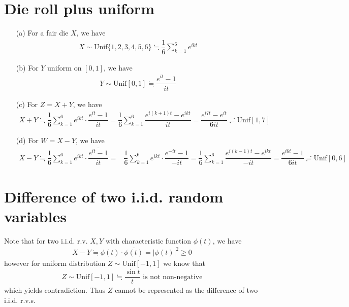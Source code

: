 \documentclass[11pt,a4paper]{article}
\numberwithin{equation}{section}%
\begin{document}
    

\section{Die roll plus uniform}\label{sec:die_roll_plus_uniform}



\begin{itemize}[topsep=2pt,itemsep=0pt]
    \item[(a)] For a fair die $ X $, we have
    \begin{align*}
         X\sim \mathrm{ Unif } \{1,2,3,4,5,6\} \fallingdotseq \dfrac{ 1 }{ 6 }\sum_{k=1}^6 e^{ i k t}
    \end{align*}
    \item[(b)] For $ Y $ uniform on $ [0,1] $, we have
    \begin{align*}
        Y\sim \mathrm{ Unif } [0,1] \fallingdotseq \dfrac{ e^{i t}-1 }{ it }  
    \end{align*}
    \item[(c)] For $ Z=X+Y $, we have
    \begin{align*}
        X+Y\fallingdotseq \dfrac{ 1 }{ 6 }\sum_{k=1}^6 e^{ i k t} \cdot \dfrac{ e^{i t}-1 }{ it } =\dfrac{ 1 }{ 6 }\sum_{k=1}^6 \dfrac{ e^{i (k+1) t}-e^{i k t} }{ it } =\dfrac{ e^{i 7 t}-e^{i t} }{ 6it } \risingdotseq \mathrm{ Unif } [1,7] 
    \end{align*}
    \item[(d)] For $ W=X-Y $, we have
    \begin{align*}
        X-Y\fallingdotseq \dfrac{ 1 }{ 6 }\sum_{k=1}^6 e^{ i k t} \cdot \overline{\dfrac{ e^{i t}-1 }{ it }} =& \dfrac{ 1 }{ 6 }\sum_{k=1}^6 e^{ i k t} \cdot \dfrac{ e^{-i t}-1 }{ -it } = \dfrac{ 1 }{ 6 }\sum_{k=1}^6 \dfrac{ e^{i (k-1) t}-e^{i k t} }{ -it } = \dfrac{ e^{i 6 t} -1 }{ 6it } \risingdotseq \mathrm{ Unif }[0,6]
    \end{align*}
\end{itemize}

    
\section{Difference of two i.i.d. random variables}

Note that for two i.i.d. r.v. $ X,Y $ with characteristic function $ \phi(t) $, we have
\begin{align*}
    X-Y\fallingdotseq \phi(t)\cdot \overline{\phi(t)} =|\phi(t)|^2 \geq 0
\end{align*}
however for uniform distribution $ Z\sim \mathrm{ Unif }[-1,1]  $ we know that
\begin{align*}
    Z\sim \mathrm{ Unif }[-1,1] \fallingdotseq \dfrac{ \sin t }{ t } \text{ is not non-negative}
\end{align*}
which yields contradiction. Thus $ Z $ cannot be represented as the difference of two i.i.d. r.v.s.
\end{document}

